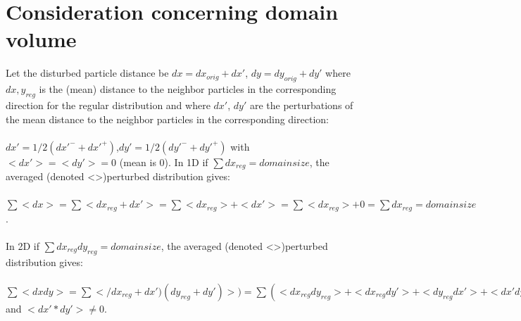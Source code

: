 \documentclass[11pt,a4paper,twoside]{report}
\begin{document}
\appendix
\appendixpage
\addappheadtotoc

\chapter{Consideration concerning domain volume}
\label{app:DomainVolume}
 Let the disturbed particle distance be $dx=dx_{\mathit{orig}}+dx'$, $dy=dy_{\mathit{orig}}+dy'$ where $dx,y_{\mathit{reg}}$ is the (mean) distance to the neighbor particles in the corresponding direction for the regular distribution
 and where $dx'$, $dy'$ are the perturbations of the mean distance to the neighbor particles in the corresponding direction:\\
\\
 $dx'=1/2(dx'^-+dx'^+)$,$dy'=1/2(dy'^-+dy'^+)$ with $<dx'>=<dy'>=0$ (mean is 0).
 In 1D if $\sum dx_{\mathit{reg}}=domainsize$, the averaged (denoted <>)perturbed distribution gives: \\
\\
$\sum <dx>=\sum <dx_{\mathit{reg}}+dx'>=\sum <dx_{\mathit{reg}}>+<dx'>=\sum<dx_{\mathit{reg}}>+0=\sum dx_{\mathit{reg}}=domainsize$.\\
\\
 In 2D if $\sum dx_{\mathit{reg}}dy_{\mathit{reg}}=domainsize$, the averaged (denoted <>)perturbed distribution gives: \\
\\
$\sum <dxdy>=\sum </dx_{\mathit{reg}}+dx')(dy_{\mathit{reg}}+dy')>)=\sum (<dx_{\mathit{reg}}dy_{\mathit{reg}}>+<dx_{\mathit{reg}}dy'>+<dy_{\mathit{reg}}dx'>+<dx'dy>)=\sum (dx_{\mathit{reg}}dy_{\mathit{reg}})+\sum (<dx'dy'>)=domainsize+sum(<dx'dy'>)$
 and $<dx'*dy'>\neq0$. 
\end{document}

